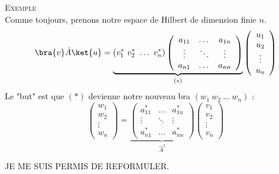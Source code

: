\textsc{Exemple}\\
Comme toujours, prenons notre espace de Hilbert de dimension finie $n$.
\begin{equation}
\bra{v}\hat{A}\ket{u} = \underbrace{(v_1^*\ v_2^*\ \dots\ v_n^*)\left(\begin{array}{ccc}
a_{11} & \dots & a_{1n}\\
\vdots &\ddots &\vdots\\
a_{n1} & \dots & a_{nn}
\end{array}\right)}_{(*)}\left(\begin{array}{c}
u_1\\
u_2\\
\vdots\\
u_n
\end{array}\right)
\end{equation}
Le "but" est que $(*)$ devienne notre nouveau bra $(w_1\ w_2\ \dots\ w_n)$ :
\begin{equation}
\left(\begin{array}{c}
w_1\\
w_2\\
\vdots\\
w_n
\end{array}\right) = \underbrace{\left(\begin{array}{ccc}
a_{11}^* & \dots & a_{1n}^*\\
\vdots &\ddots &\vdots\\
a_{n1}^* & \dots & a_{nn}^*
\end{array}\right)}_{\hat{A}^\dagger}\left(\begin{array}{c}
v_1\\
v_2\\
\vdots\\
v_n
\end{array}\right)
\end{equation}

JE ME SUIS PERMIS DE REFORMULER.\\

